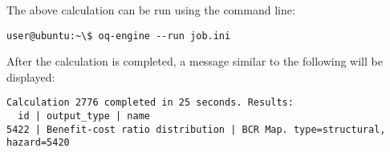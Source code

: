 The above calculation can be run using the command line:

\begin{Verbatim}[frame=single, commandchars=\\\{\}, samepage=true]
user@ubuntu:~\$ oq-engine --run job.ini
\end{Verbatim}

After the calculation is completed, a message similar to the following will be
displayed:

\begin{Verbatim}[frame=single, commandchars=\\\{\}, samepage=true]
Calculation 2776 completed in 25 seconds. Results:
  id | output_type | name
5422 | Benefit-cost ratio distribution | BCR Map. type=structural, hazard=5420
\end{Verbatim}